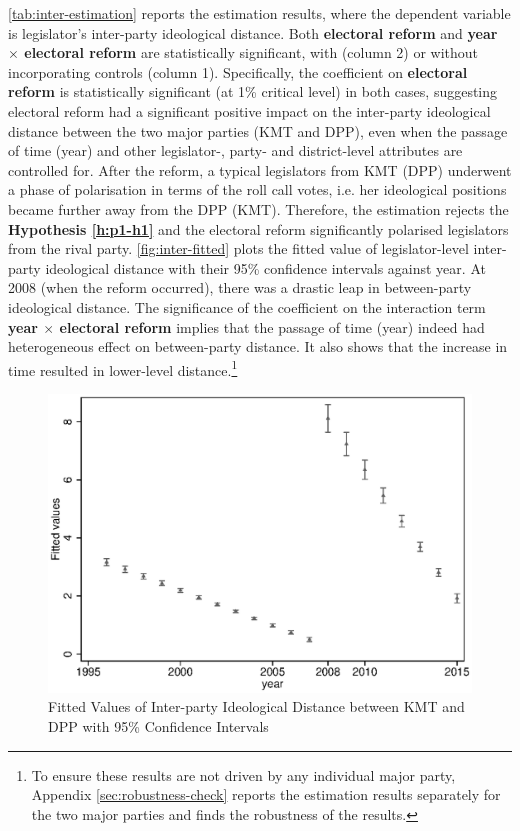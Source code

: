 \autoref{tab:inter-estimation} reports the estimation results, where the dependent variable is legislator's inter-party ideological distance. Both \textbf{electoral reform} and \textbf{year $\times$ electoral reform }are statistically significant, with (column 2) or without incorporating controls (column 1). Specifically, the coefficient on \textbf{electoral reform} is statistically significant (at 1\% critical level) in both cases, suggesting electoral reform had a significant positive impact on the inter-party ideological distance between the two major parties (KMT and DPP), even when the passage of time (year) and other legislator-, party- and district-level attributes are controlled for. After the reform, a typical legislators from KMT (DPP) underwent a phase of polarisation in terms of the roll call votes, i.e. her ideological positions became further away from the DPP (KMT). Therefore, the estimation rejects the \textbf{Hypothesis \ref{h:p1-h1}} and the electoral reform significantly polarised legislators from the rival party. \autoref{fig:inter-fitted} plots the fitted value of legislator-level inter-party ideological distance with their 95\% confidence intervals against year. At 2008 (when the reform occurred), there was a drastic leap in between-party ideological distance. The significance of the coefficient on the interaction term \textbf{year $\times$ electoral reform} implies that the passage of time (year) indeed had heterogeneous effect on between-party distance. It also shows that the increase in time resulted in lower-level distance.\footnote{To ensure these results are not driven by any individual major party, Appendix \ref{sec:robustness-check} reports the estimation results separately for the two major parties and finds the robustness of the results.} 

\begin{figure}[ht]
\caption{Fitted Values of Inter-party Ideological Distance between KMT and DPP with 95\% Confidence Intervals \label{fig:inter-fitted}}\centering{}\includegraphics[scale=0.59]{02-Chapter-Two/image/all_inter.eps}
\end{figure}

